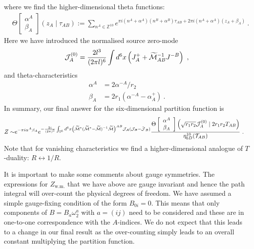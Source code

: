 \documentclass[11pt]{article}
\numberwithin{equation}{section}
\begin{document}
where we find the higher-dimensional theta functions:
\begin{align}
  &\Theta \left[\begin{array}{c}
\alpha^A \\ \beta_A 	
\end{array}\right]
\left( z_{A}\mid \tau_{AB} \right)   := \sum_{n^{A}\in {\mathbb Z}^{10}}		e^{\pi i  (n^{A}+\alpha^A )(n^{B}+ \alpha^B )\tau_{AB} + 2\pi  i (n^{A}+\alpha^A)(z_A +\beta_A)}\ .
\end{align}
Here we have introduced the normalised source zero-mode
\begin{align} \mathcal{J}^{(0)}_A = \frac{2l^3}{(2\pi l)^6} \int d^6 x \left(J^{+}_A + \widetilde{\cal M}^{-1}_{AB}J^{-B} \right)\ ,
\end{align}
and theta-characteristics
\begin{align}
\alpha^A &= 2\alpha^{-A}/r_2 \nonumber\\
\beta_A &=	2r_1(\alpha^{-A}-\alpha^+_A)  \ .
\end{align} 
In summary, our final answer for the six-dimensional partition function is
\begin{align}
    Z \sim &e^{-\pi i \alpha^A\beta_A}e^{-\frac{2i}{(2\pi)^5} \int_{{\mathbb T}^6} d^6x  \left(\widetilde{\cal M}^*(\widetilde{\cal M}^*-\widetilde{\cal M})^{-1}\widetilde{\cal M}\right)^{AB}{\cal J_A}({\cal J}_B-{\bar {\cal J}}_B)} \frac{\Theta \left[\begin{array}{c}
\alpha^A \\ \beta_A 	
\end{array}\right]
\left( \sqrt{r_1r_2}{\cal J}^{(0)}_{A}\mid 2r_1r_2{  T}_{AB} \right)}{\eta^{10}_{6D}({\cal T}_{AB})}\ .
\end{align}
Note that for vanishing characteristics we find a higher-dimensional analogue of $T$-duality: $R\leftrightarrow 1/R$.
 
It is important to make some comments about gauge symmetries. The expressions for $Z_{\text{w.m.}}$ that we have above are gauge invariant and hence the path integral will over-count the physical degrees of freedom. We have assumed a simple gauge-fixing condition of the form $B_{0i}=0$.
This means that only components of $B = B_a\omega^a_2$ with $a= (i j)$ need to be considered and these are in one-to-one correspondence with the $A$-indices. We do not expect that this leads to a change in our final result as the over-counting simply leads to an overall constant multiplying the partition function. 
\end{document}
